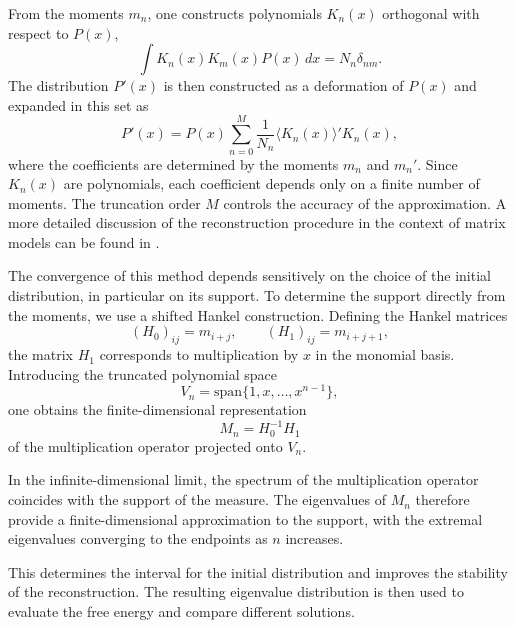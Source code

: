 \documentclass[10pt]{article}
\theoremstyle{plain}
\theoremstyle{definition}
\theoremstyle{plain}
\begin{document}
From the moments $m_n$, one constructs polynomials $K_n(x)$ orthogonal with
respect to $P(x)$,
\begin{equation}
\int K_n(x) K_m(x) P(x)\, dx = N_n \delta_{nm}.
\end{equation}
The distribution $P'(x)$ is then constructed as a deformation of $P(x)$ and
expanded in this set as
\begin{equation}
P'(x) = P(x) \sum_{n=0}^{M} \frac{1}{N_n}
\langle K_n(x) \rangle' K_n(x),
\end{equation}
where the coefficients are determined by the moments $m_n$ and $m_n'$. Since
$K_n(x)$ are polynomials, each coefficient depends only on a finite number of
moments. The truncation order $M$ controls the accuracy of the approximation.
A more detailed discussion of the reconstruction procedure in the context of
matrix models can be found in \cite{Kovacik:2025qgj}.

The convergence of this method depends sensitively on the choice of the initial
distribution, in particular on its support. To determine the support directly
from the moments, we use a shifted Hankel construction. Defining the Hankel
matrices
\begin{equation}
(H_0)_{ij}=m_{i+j}, \qquad (H_1)_{ij}=m_{i+j+1},
\end{equation}
the matrix $H_1$ corresponds to multiplication by $x$ in the monomial basis.
Introducing the truncated polynomial space
\begin{equation}
V_n=\mathrm{span}\{1,x,\dots,x^{n-1}\},
\end{equation}
one obtains the finite-dimensional representation
\begin{equation}
M_n = H_0^{-1}H_1
\end{equation}
of the multiplication operator projected onto $V_n$.

In the infinite-dimensional limit, the spectrum of the multiplication operator
coincides with the support of the measure. The eigenvalues of $M_n$ therefore
provide a finite-dimensional approximation to the support, with the extremal
eigenvalues converging to the endpoints as $n$ increases.

This determines the interval for the initial distribution and improves the
stability of the reconstruction. The resulting eigenvalue distribution is then
used to evaluate the free energy and compare different solutions.
\end{document}

